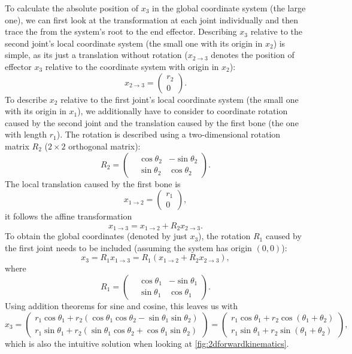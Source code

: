 To calculate the absolute position of \(x_3\) in the global coordinate system (the large one),
we can first look at the transformation at each joint individually and then trace the  from the system's root to the end effector.
Describing \(x_3\) relative to the second joint's local coordinate system (the small one with its origin in \(x_2\)) is simple,
as its just a translation without rotation (\(x_{2\rightarrow 3}\) denotes the position of effector \(x_3\) relative to the coordinate system with origin in \(x_2\)):
\[x_{2\rightarrow 3}=\begin{pmatrix*}
  r_2\\
  0
\end{pmatrix*}.\]
To describe \(x_2\) relative to the first joint's local coordinate system (the small one with its origin in \(x_1\)),
we additionally have to consider to coordinate rotation caused by the second joint and the translation caused by the first bone (the one with length \(r_1\)).
The rotation is described using a two-dimensional rotation matrix \(R_2\) (\(2\times 2\) orthogonal matrix):
\[R_2=\begin{pmatrix*}
  &\cos\theta_2 &-\sin\theta_2\\
  &\sin\theta_2 &\cos\theta_2
\end{pmatrix*}.\]
The local translation caused by the first bone is
\[x_{1\rightarrow 2}=\begin{pmatrix*}
  r_1\\
  0
\end{pmatrix*},\]
it follows the affine transformation
\[x_{1\rightarrow 3}=x_{1\rightarrow 2}+R_2 x_{2\rightarrow 3}.\]
To obtain the global coordinates (denoted by just \(x_3\)), the rotation \(R_1\) caused by the first joint needs to be included (assuming the system has origin \((0, 0)\)):
\[x_3=R_1 x_{1\rightarrow 3}=R_1(x_{1\rightarrow 2}+R_2 x_{2\rightarrow 3}),\]
where
\[R_1=\begin{pmatrix*}
  &\cos\theta_1 &-\sin\theta_1\\
  &\sin\theta_1 &\cos\theta_1
\end{pmatrix*}.\]
Using addition theorems for sine and cosine, this leaves us with
\[x_3=\begin{pmatrix*}
  r_1\cos\theta_1+r_2(\cos\theta_1\cos\theta_2-\sin\theta_1\sin\theta_2)\\
  r_1\sin\theta_1+r_2(\sin\theta_1\cos\theta_2+\cos\theta_1\sin\theta_2)
\end{pmatrix*}=\begin{pmatrix*}
  r_1\cos\theta_1+r_2\cos(\theta_1+\theta_2)\\
  r_1\sin\theta_1+r_2\sin(\theta_1+\theta_2)
\end{pmatrix*},\]
which is also the intuitive solution when looking at \autoref{fig:2dforwardkinematics}.

